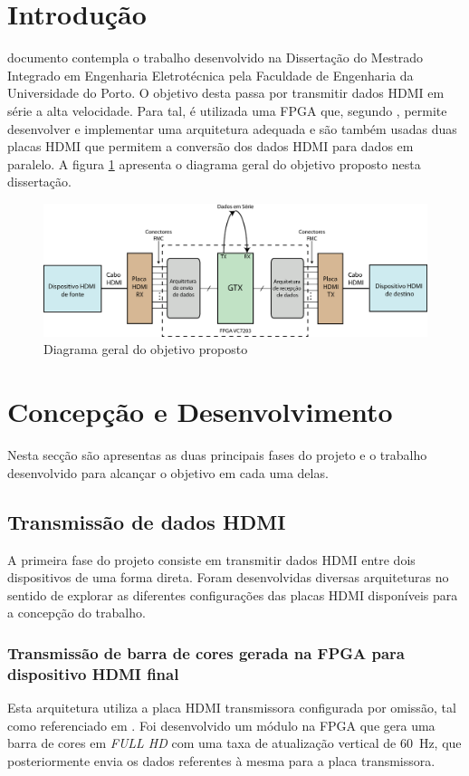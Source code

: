 \documentclass[a4paper]{IEEEtran}
\begin{document}
\section{Introdução}

 documento contempla o trabalho desenvolvido na Dissertação do Mestrado Integrado em Engenharia Eletrotécnica pela Faculdade de Engenharia da Universidade do Porto. 
O objetivo desta passa por transmitir dados HDMI em série a alta velocidade. Para tal, é utilizada uma FPGA que, segundo \cite{R008}, permite desenvolver e implementar uma arquitetura adequada e são também usadas duas placas HDMI que permitem a conversão dos dados HDMI para dados em paralelo. A figura \ref{fig:1} apresenta o diagrama geral do objetivo proposto nesta dissertação.

\begin{figure}[h!]
	\centering
	\includegraphics[width=0.9\linewidth]{diagrama_inicial}
	\caption{Diagrama geral do objetivo proposto}
	\label{fig:1}
\end{figure}

\section{Concepção e Desenvolvimento}
Nesta secção são apresentas as duas principais fases do projeto e o trabalho desenvolvido para alcançar o objetivo em cada uma delas.

\subsection{Transmissão de dados HDMI}
A primeira fase do projeto consiste em transmitir dados HDMI entre dois dispositivos de uma forma direta. Foram desenvolvidas diversas arquiteturas no sentido de explorar as diferentes configurações das placas HDMI disponíveis para a concepção do trabalho.

\subsubsection{Transmissão de barra de cores gerada na FPGA para dispositivo HDMI final}
Esta arquitetura utiliza a placa HDMI transmissora configurada por omissão, tal como referenciado em \cite{R009}. Foi desenvolvido um módulo na FPGA que gera uma barra de cores em \textit{FULL HD} com uma taxa de atualização vertical de \SI{60}{\hertz}, que posteriormente envia os dados referentes à mesma para a placa transmissora. 
\end{document}
